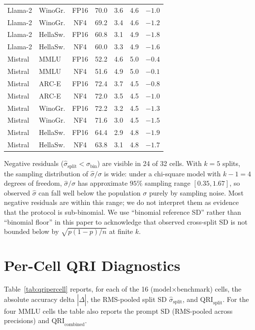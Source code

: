 \documentclass{article}
\begin{document}
\begin{table}[t]
\begin{tabular}{llccccc}
Llama-2   & WinoGr. & FP16 & 70.0 & 3.6 & 4.6 & $-1.0$ \\
Llama-2   & WinoGr. & NF4  & 69.2 & 3.4 & 4.6 & $-1.2$ \\
Llama-2   & HellaSw.& FP16 & 60.8 & 3.1 & 4.9 & $-1.8$ \\
Llama-2   & HellaSw.& NF4  & 60.0 & 3.3 & 4.9 & $-1.6$ \\
\midrule
Mistral   & MMLU    & FP16 & 52.2 & 4.6 & 5.0 & $-0.4$ \\
Mistral   & MMLU    & NF4  & 51.6 & 4.9 & 5.0 & $-0.1$ \\
Mistral   & ARC-E   & FP16 & 72.4 & 3.7 & 4.5 & $-0.8$ \\
Mistral   & ARC-E   & NF4  & 72.0 & 3.5 & 4.5 & $-1.0$ \\
Mistral   & WinoGr. & FP16 & 72.2 & 3.2 & 4.5 & $-1.3$ \\
Mistral   & WinoGr. & NF4  & 71.6 & 3.0 & 4.5 & $-1.5$ \\
Mistral   & HellaSw.& FP16 & 64.4 & 2.9 & 4.8 & $-1.9$ \\
Mistral   & HellaSw.& NF4  & 63.8 & 3.1 & 4.8 & $-1.7$ \\
\bottomrule
\end{tabular}
\end{table}

Negative residuals ($\hat\sigma_{\text{split}} < \sigma_{\text{bin}}$) are visible in 24 of 32 cells. With $k{=}5$ splits, the sampling distribution of $\hat\sigma/\sigma$ is wide: under a chi-square model with $k-1{=}4$ degrees of freedom, $\hat\sigma/\sigma$ has approximate $95\%$ sampling range $[0.35, 1.67]$, so observed $\hat\sigma$ can fall well below the population $\sigma$ purely by sampling noise. Most negative residuals are within this range; we do not interpret them as evidence that the protocol is sub-binomial. We use ``binomial reference SD'' rather than ``binomial floor'' in this paper to acknowledge that observed cross-split SD is not bounded below by $\sqrt{p(1-p)/n}$ at finite $k$.

\section{Per-Cell QRI Diagnostics}
\label{sec:qritab}

Table~\ref{tab:qripercell} reports, for each of the 16 (model$\times$benchmark) cells, the absolute accuracy delta $|\hat\Delta|$, the RMS-pooled split SD $\hat\sigma_{\text{split}}$, and $\mathrm{QRI}_{\text{split}}$. For the four MMLU cells the table also reports the prompt SD (RMS-pooled across precisions) and $\mathrm{QRI}_{\text{combined}}$.
\end{document}
